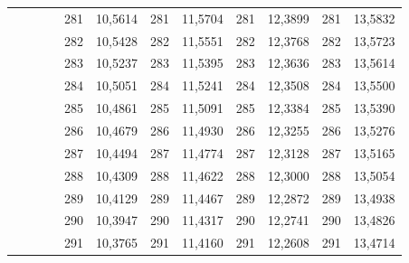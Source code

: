 \documentclass[a4paper,12pt]{article} %
\begin{document}
\begin{longtable}[c]{cccccccccc|c|c|}
	&  &  & \multicolumn{1}{c|}{} & \multicolumn{1}{c|}{281} & \multicolumn{1}{c|}{10,5614} & \multicolumn{1}{c|}{281} & \multicolumn{1}{c|}{11,5704} & \multicolumn{1}{c|}{281} & 12,3899 & 281 & 13,5832 \\ \cline{5-12} 
	&  &  & \multicolumn{1}{c|}{} & \multicolumn{1}{c|}{282} & \multicolumn{1}{c|}{10,5428} & \multicolumn{1}{c|}{282} & \multicolumn{1}{c|}{11,5551} & \multicolumn{1}{c|}{282} & 12,3768 & 282 & 13,5723 \\ \cline{5-12} 
	&  &  & \multicolumn{1}{c|}{} & \multicolumn{1}{c|}{283} & \multicolumn{1}{c|}{10,5237} & \multicolumn{1}{c|}{283} & \multicolumn{1}{c|}{11,5395} & \multicolumn{1}{c|}{283} & 12,3636 & 283 & 13,5614 \\ \cline{5-12} 
	&  &  & \multicolumn{1}{c|}{} & \multicolumn{1}{c|}{284} & \multicolumn{1}{c|}{10,5051} & \multicolumn{1}{c|}{284} & \multicolumn{1}{c|}{11,5241} & \multicolumn{1}{c|}{284} & 12,3508 & 284 & 13,5500 \\ \cline{5-12} 
	&  &  & \multicolumn{1}{c|}{} & \multicolumn{1}{c|}{285} & \multicolumn{1}{c|}{10,4861} & \multicolumn{1}{c|}{285} & \multicolumn{1}{c|}{11,5091} & \multicolumn{1}{c|}{285} & 12,3384 & 285 & 13,5390 \\ \cline{5-12} 
	&  &  & \multicolumn{1}{c|}{} & \multicolumn{1}{c|}{286} & \multicolumn{1}{c|}{10,4679} & \multicolumn{1}{c|}{286} & \multicolumn{1}{c|}{11,4930} & \multicolumn{1}{c|}{286} & 12,3255 & 286 & 13,5276 \\ \cline{5-12} 
	&  &  & \multicolumn{1}{c|}{} & \multicolumn{1}{c|}{287} & \multicolumn{1}{c|}{10,4494} & \multicolumn{1}{c|}{287} & \multicolumn{1}{c|}{11,4774} & \multicolumn{1}{c|}{287} & 12,3128 & 287 & 13,5165 \\ \cline{5-12} 
	&  &  & \multicolumn{1}{c|}{} & \multicolumn{1}{c|}{288} & \multicolumn{1}{c|}{10,4309} & \multicolumn{1}{c|}{288} & \multicolumn{1}{c|}{11,4622} & \multicolumn{1}{c|}{288} & 12,3000 & 288 & 13,5054 \\ \cline{5-12} 
	&  &  & \multicolumn{1}{c|}{} & \multicolumn{1}{c|}{289} & \multicolumn{1}{c|}{10,4129} & \multicolumn{1}{c|}{289} & \multicolumn{1}{c|}{11,4467} & \multicolumn{1}{c|}{289} & 12,2872 & 289 & 13,4938 \\ \cline{5-12} 
	&  &  & \multicolumn{1}{c|}{} & \multicolumn{1}{c|}{290} & \multicolumn{1}{c|}{10,3947} & \multicolumn{1}{c|}{290} & \multicolumn{1}{c|}{11,4317} & \multicolumn{1}{c|}{290} & 12,2741 & 290 & 13,4826 \\ \cline{5-12} 
	&  &  & \multicolumn{1}{c|}{} & \multicolumn{1}{c|}{291} & \multicolumn{1}{c|}{10,3765} & \multicolumn{1}{c|}{291} & \multicolumn{1}{c|}{11,4160} & \multicolumn{1}{c|}{291} & 12,2608 & 291 & 13,4714 \\ \cline{5-12} 

\end{longtable}
\end{document}
